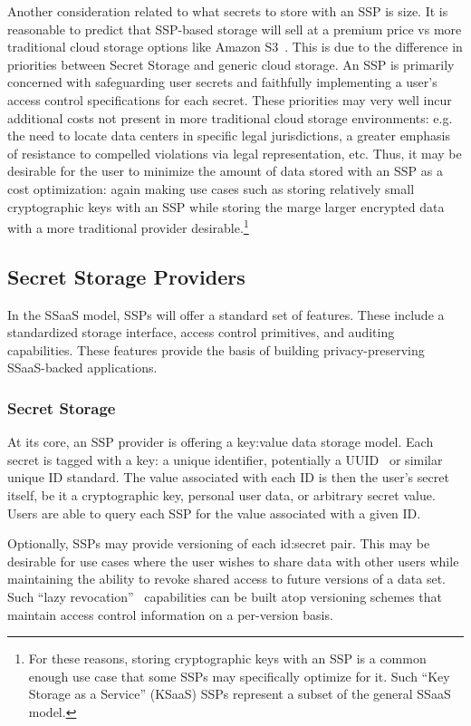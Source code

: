 Another consideration related to what secrets to store with an SSP is
size. It is reasonable to predict that SSP-based storage will sell at
a premium price vs more traditional cloud storage options like Amazon
S3~\cite{amazon-s3}. This is due to the difference in priorities
between Secret Storage and generic cloud storage. An SSP is primarily
concerned with safeguarding user secrets and faithfully implementing a
user's access control specifications for each secret. These priorities
may very well incur additional costs not present in more traditional
cloud storage environments: e.g. the need to locate data centers in
specific legal jurisdictions, a greater emphasis of resistance to
compelled violations via legal representation, etc. Thus, it may be
desirable for the user to minimize the amount of data stored with an
SSP as a cost optimization: again making use cases such as storing
relatively small cryptographic keys with an SSP while storing the
marge larger encrypted data with a more traditional provider
desirable.\footnote{For these reasons, storing cryptographic keys with
  an SSP is a common enough use case that some SSPs may specifically
  optimize for it. Such ``Key Storage as a Service'' (KSaaS) SSPs
  represent a subset of the general SSaaS model.}

\subsection{Secret Storage Providers}

In the SSaaS model, SSPs will offer a standard set of features. These
include a standardized storage interface, access control primitives,
and auditing capabilities. These features provide the basis of
building privacy-preserving SSaaS-backed applications.

\subsubsection{Secret Storage}

At its core, an SSP provider is offering a key:value data storage
model. Each secret is tagged with a key: a unique identifier,
potentially a UUID~\cite{leach2005} or similar unique ID standard. The
value associated with each ID is then the user's secret itself, be it
a cryptographic key, personal user data, or arbitrary secret
value. Users are able to query each SSP for the value associated with
a given ID.

Optionally, SSPs may provide versioning of each id:secret pair. This
may be desirable for use cases where the user wishes to share data
with other users while maintaining the ability to revoke shared access
to future versions of a data set. Such ``lazy
revocation''~\cite{kallahalla2003} capabilities can be built atop
versioning schemes that maintain access control information on a
per-version basis.

